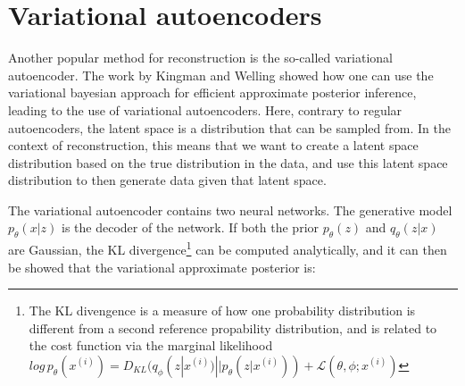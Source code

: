 \section{Variational autoencoders}
Another popular method for reconstruction is the so-called variational autoencoder. The work by Kingman and Welling \cite{VAE} showed how
one can use the variational bayesian approach for efficient approximate posterior inference, leading to the use of variational autoencoders.
Here, contrary to regular autoencoders, the latent space is a distribution that can be sampled from. In the context of reconstruction, this means that
we want to create a latent space distribution based on the true distribution in the data, and use this latent space distribution to then generate
data given that latent space. \par
The variational autoencoder contains two neural networks. The generative model $p_{\theta}(x|z)$ is the decoder of the network.
If both the prior $p_{\theta}(z)$ and $q_{\theta}(z|x)$ are Gaussian, the KL divergence\footnote{The KL divengence is a measure of how one probability distribution is different from a second reference propability distribution, and is related to the cost function via the marginal likelihood $log\, p_{\theta}(x^{(i)}) = D_{KL}(q_{\phi}(z|x^{(i)})||p_{\theta}(z|x^{(i)})) + \mathcal{L}(\theta, \phi;x^{(i)})$} can be computed analytically, and it 
can then be showed\cite{VAE} that the variational approximate posterior is:

